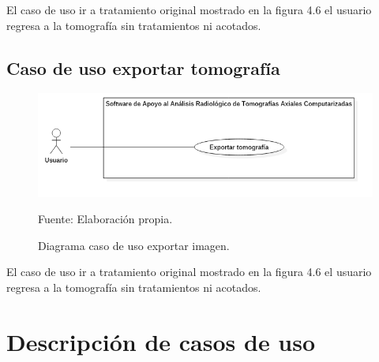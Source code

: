 \documentclass[12pt]{report}
\begin{document}
El caso de uso ir a tratamiento original mostrado en la figura 4.6 el usuario regresa a la tomografía sin tratamientos ni acotados.

\subsection{Caso de uso exportar tomografía}
\begin{figure}[H]
\centering
\includegraphics[width = 9 cm, height =  7 cm]{expor}
\caption{Diagrama caso de uso exportar imagen.}
Fuente: Elaboración propia.
\end{figure}

El caso de uso ir a tratamiento original mostrado en la figura 4.6 el usuario regresa a la tomografía sin tratamientos ni acotados.

\section{Descripción de casos de uso}
\end{document}
